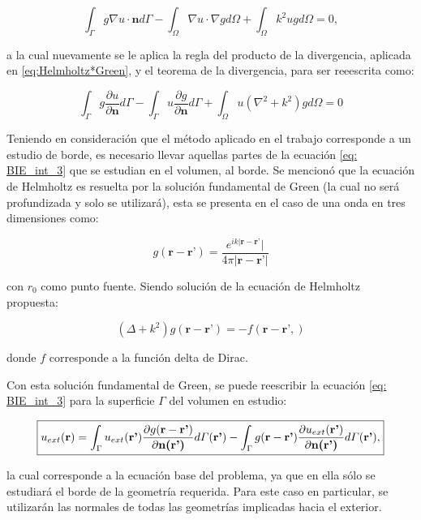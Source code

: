 \documentclass[12pt,letterpaper]{report}
\numberwithin{equation}{section}
\begin{document}
\begin{equation}
\int_{\Gamma}g\nabla u\cdot\textbf{n}d\varGamma-\int_{\Omega}\nabla u\cdot\nabla g d\varOmega+\int_{\Omega}k^2ugd\varOmega=0,
\label{eq: BIE_int_2}
\end{equation}

\noindent a la cual nuevamente se le aplica la regla del producto de la divergencia, aplicada en \ref{eq:Helmholtz*Green}, y el teorema de la divergencia, para ser reeescrita como:

\begin{equation}
\int_{\Gamma}g\frac{\partial u}{\partial\textbf{n}}d\varGamma-\int_{\Gamma}u\frac{\partial g}{\partial\textbf{n}}d\varGamma+\int_{\Omega}u(\nabla^2+k^2)gd\varOmega=0
\label{eq: BIE_int_3}
\end{equation}

Teniendo en consideración que el método aplicado en el trabajo corresponde a un estudio de borde, es necesario llevar aquellas partes de la ecuación \ref{eq: BIE_int_3} que se estudian en el volumen, al borde. 
Se mencionó que la ecuación de Helmholtz es resuelta por la solución fundamental de Green (la cual no será profundizada y solo se utilizará), esta se presenta en el caso de una onda en tres dimensiones como: 

$$g(\textbf{r}-\textbf{r'})=\frac{e^{ik|\textbf{r}-\textbf{r'}}|}{4\pi |\textbf{r}-\textbf{r'}|}$$

\noindent con $r_{0}$ como punto fuente. Siendo solución de la ecuación de Helmholtz propuesta:

\begin{equation}
(\Delta+k^2)g(\textbf{r}-\textbf{r'})=-f(\textbf{r}-\textbf{r'},)
\label{eq:Helmholtz green}
\end{equation}

donde $f$ corresponde a la función delta de Dirac.

Con esta solución fundamental de Green, se puede reescribir la ecuación \ref{eq: BIE_int_3} para la superficie $\Gamma$ del volumen en estudio:

\begin{equation}
\boxed{
	u_{ext}(\textbf{r})=\int_{\Gamma}u_{ext}(\textbf{r'})\frac{\partial g(\textbf{r}-\textbf{r'})}{\partial\textbf{n(\textbf{r'})}}d\varGamma(\textbf{r'}) - \int_{\Gamma}g(\textbf{r}-\textbf{r'})\frac{\partial u_{ext}(\textbf{r'})}{\partial\textbf{n(\textbf{r'})}}d\varGamma(\textbf{r'}),
	\label{eq: BIE_ext}
}	
\end{equation}

\noindent la cual corresponde a la ecuación base del problema, ya que en ella sólo se estudiará el borde de la geometría requerida. Para este caso en particular, se utilizarán las normales de todas las geometrías implicadas hacia el exterior. 
\end{document}
